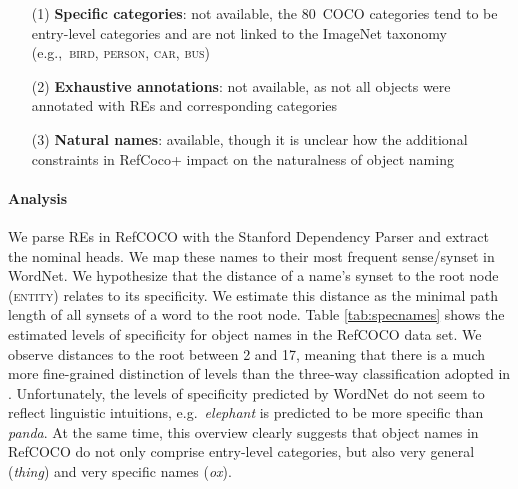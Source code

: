 \documentclass[10pt, a4paper]{article}
\newcommand{\refexp}[1]{\textsl{#1}}
\newcommand{\cat}[1]{\textsc{#1}}
\newcommand{\refcoco}{RefCOCO\xspace}
\begin{document}
\begin{itemize}
     		\item[(1)] \textbf{Specific categories}: not available, the $80$~COCO categories tend to be entry-level categories and are not linked to the ImageNet taxonomy (e.g.,~\cat{bird, person, car, bus})
		\item[(2)] \textbf{Exhaustive annotations}: not available, as not all objects were annotated with REs and corresponding categories
		   \item[(3)] \textbf{Natural names}: available, though it is unclear how the additional constraints in RefCoco+ impact on the naturalness of object naming
\end{itemize}

\paragraph{Analysis} We parse REs in \refcoco with the Stanford Dependency Parser and extract the nominal heads. We map these names to their most frequent sense/synset in WordNet.
We hypothesize that the distance of a name's synset to the root node (\cat{entity}) relates to its specificity.
We estimate this distance as the minimal path length of all synsets of a word  to the root node.
Table \ref{tab:specnames} shows the estimated levels of specificity for object names in the \refcoco data set.
We observe distances to the root between 2 and 17, meaning that there is a much more fine-grained distinction of levels than the three-way classification adopted in \cite{graf2016animal}.
Unfortunately, the levels of specificity predicted by WordNet do not seem to reflect linguistic intuitions, e.g.\ \refexp{elephant} is predicted to be more specific than \refexp{panda}.
At the same time, this overview clearly suggests that object names in \refcoco do not only comprise entry-level categories, but also very general (\refexp{thing}) and very specific names (\refexp{ox}).
\end{document}
